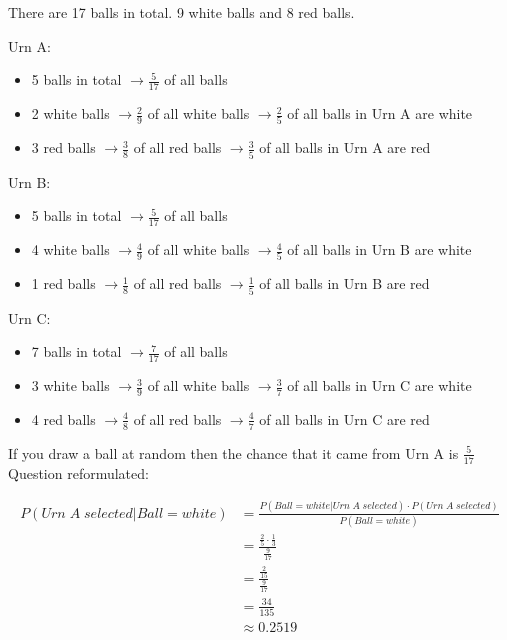 \documentclass[a4paper]{article}
\begin{document}
\begin{enumerate}
There are 17 balls in total. 9 white balls and 8 red balls.


Urn A: 

\begin{itemize}
	\item 5 balls in total $\rightarrow \frac{5}{17}$ of all balls
	\item 2 white balls $\rightarrow \frac{2}{9}$ of all white balls $\rightarrow \frac{2}{5}$ of all balls in Urn A are white
	\item 3 red balls $\rightarrow \frac{3}{8}$ of all red balls $\rightarrow \frac{3}{5}$ of all balls in Urn A are red
\end{itemize}


Urn B: 

\begin{itemize}
	\item 5 balls in total $\rightarrow \frac{5}{17}$ of all balls
	\item 4 white balls $\rightarrow \frac{4}{9}$ of all white balls $\rightarrow \frac{4}{5}$ of all balls in Urn B are white
	\item 1 red balls $\rightarrow \frac{1}{8}$ of all red balls $\rightarrow \frac{1}{5}$ of all balls in Urn B are red
\end{itemize}

Urn C: 

\begin{itemize}
	\item 7 balls in total $\rightarrow \frac{7}{17}$ of all balls
	\item 3 white balls $\rightarrow \frac{3}{9}$ of all white balls $\rightarrow \frac{3}{7}$ of all balls in Urn C are white
	\item 4 red balls $\rightarrow \frac{4}{8}$ of all red balls $\rightarrow \frac{4}{7}$ of all balls in Urn C are red
\end{itemize}

If you draw a ball at random then the chance that it came from Urn A is $\frac{5}{17}$\\

Question reformulated: 

\begin{align*}
P(Urn \; A \; selected | Ball = white) &= \frac{P(Ball = white | Urn \; A \; selected)\cdot P(Urn \; A \; selected)}{P(Ball = white)}\\
&= \frac{\frac{2}{5} \cdot \frac{1}{3}}{\frac{9}{17}}\\
&= \frac{\frac{2}{15}}{\frac{9}{17}}\\
&= \frac{34}{135}\\
&\approx 0.2519
\end{align*}






	
\end{enumerate}
\end{document}
